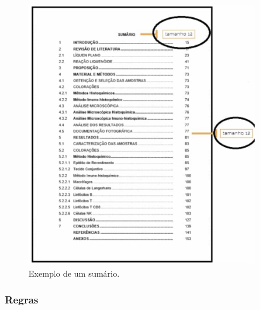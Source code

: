 \begin{figure}[h]
    \centering
    \includegraphics[width=0.9\textwidth]{Figuras/exemplo_sumario.png} %
    \caption{Exemplo de um sumário.}
    \label{fig:exemplo_sumario}
\end{figure}

\newpage

\subsubsection{Regras}

